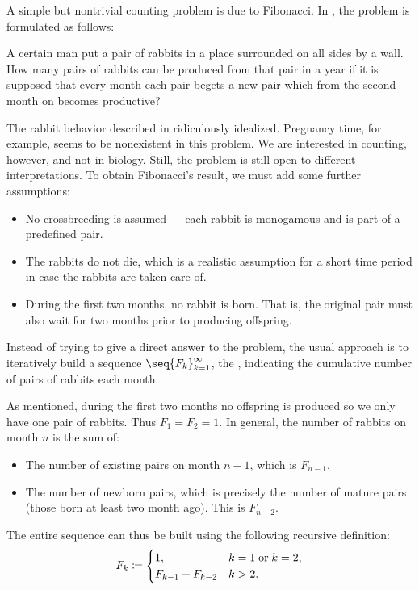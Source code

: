 \begin{example}\label{ex:fibonacci_rabbits}
  A simple but nontrivial counting problem is due to Fibonacci. In \cite{MacTutor:fibonacci}, the problem is formulated as follows:
  \begin{displayquote}
    A certain man put a pair of rabbits in a place surrounded on all sides by a wall. How many pairs of rabbits can be produced from that pair in a year if it is supposed that every month each pair begets a new pair which from the second month on becomes productive?
  \end{displayquote}

  The rabbit behavior described in ridiculously idealized. Pregnancy time, for example, seems to be nonexistent in this problem. We are interested in counting, however, and not in biology. Still, the problem is still open to different interpretations. To obtain Fibonacci's result, we must add some further assumptions:
  \begin{itemize}
    \item No crossbreeding is assumed --- each rabbit is monogamous and is part of a predefined pair.
    \item The rabbits do not die, which is a realistic assumption for a short time period in case the rabbits are taken care of.
    \item During the first two months, no rabbit is born. That is, the original pair must also wait for two months prior to producing offspring.
  \end{itemize}

  Instead of trying to give a direct answer to the problem, the usual approach is to iteratively build a sequence \( \seq{ F_k }_{k=1}^\infty \), the , indicating the cumulative number of pairs of rabbits each month.

  As mentioned, during the first two months no offspring is produced so we only have one pair of rabbits. Thus \( F_1 = F_2 = 1 \). In general, the number of rabbits on month \( n \) is the sum of:
  \begin{itemize}
    \item The number of existing pairs on month \( n - 1 \), which is \( F_{n - 1} \).
    \item The number of newborn pairs, which is precisely the number of mature pairs (those born at least two month ago). This is \( F_{n - 2} \).
  \end{itemize}

  The entire sequence can thus be built using the following recursive definition:
  \begin{equation*}
    F_k \coloneqq \begin{cases}
      1,                &k = 1 \T{or} k = 2, \\
      F_{k-1} + F_{k-2} &k > 2.
    \end{cases}
  \end{equation*}


\end{example}
